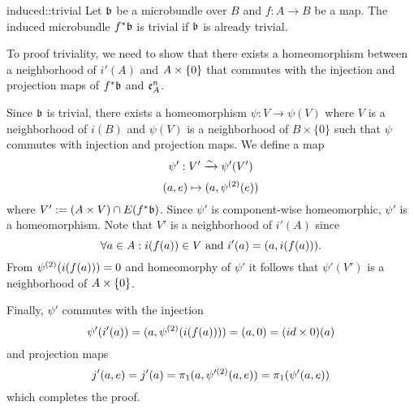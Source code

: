 \begin{mylemma}{induced::trivial}{}
    Let $\mathfrak{b}$ be a microbundle over $B$ and $f: A \to B$ be a map.
    The induced microbundle $f^*\mathfrak{b}$ is trivial if $\mathfrak{b}$ is already trivial.
\end{mylemma}

\begin{myproof}
    To proof triviality, we need to show that there exists a homeomorphism between a neighborhood of $i'(A)$ and $A \times{} \{0\}$
    that commutes with the injection and projection maps of $f^*\mathfrak{b}$ and $\mathfrak{e}^{n}_{A}$.
    
    Since $\mathfrak{b}$ is trivial, there exists a homeomorphism $\psi: V \to \psi(V)$
    where $V$ is a neighborhood of $i(B)$ and $\psi(V)$ is a neighborhood of $B \times \{0\}$
    such that $\psi$ commutes with injection and projection maps.
    We define a map 
    \[ \psi': V' \xrightarrow{\sim} \psi'(V') \]
    \[ (a, e) \mapsto (a, \psi^{(2)}(e)) \]
    where $V' := (A \times V) \cap E(f^*\mathfrak{b})$.
    Since $\psi'$ is component-wise homeomorphic, $\psi'$ is a homeomorphism.
    Note that $V'$ is a neighborhood of $i'(A)$ since
    \[ \forall a \in A: i(f(a)) \in V \text{ and } i'(a) = (a, i(f(a))). \]
    From $\psi^{(2)}(i(f(a))) = 0$ and homeomorphy of $\psi'$ it follows that $\psi'(V')$ is a neighborhood of $A \times{} \{0\}$.

    Finally, $\psi'$ commutes with the injection
    \[ \psi'(i'(a)) = (a, \psi^{(2)}(i(f(a)))) = (a, 0) = (id \times 0)(a) \]
    and projection maps
    \[ j'(a, e) = j'(a) = \pi_1(a, \psi'^{(2)}(a, e)) = \pi_1(\psi'(a, e)) \]
    which completes the proof.
\end{myproof}